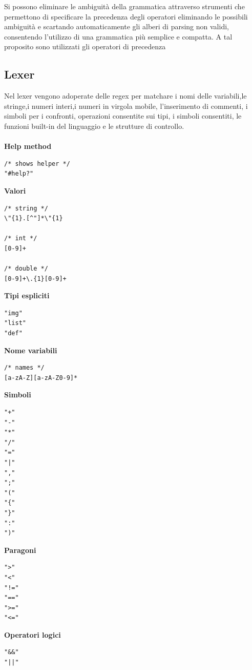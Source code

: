 \documentclass[10pt]{article}
\begin{document}
Si possono eliminare le ambiguità della grammatica attraverso strumenti che permettono di specificare la precedenza degli operatori eliminando le possibili ambiguità e scartando automaticamente gli alberi di parsing non validi, consentendo l'utilizzo di una grammatica più semplice e compatta. A tal proposito sono utilizzati gli operatori di precedenza %
\clearpage
\subsection{Lexer}
Nel lexer vengono adoperate delle regex per matchare i nomi delle variabili,le stringe,i numeri interi,i numeri in virgola mobile, l'inserimento di commenti, i simboli per i confronti, operazioni consentite sui tipi, i simboli consentiti, le funzioni built-in del linguaggio e le strutture di controllo. \\\\

\textbf{Help method}
\begin{lstlisting}[breaklines=true, postbreak=\mbox{{$\hookrightarrow$}\space}]
/* shows helper */
"#help?"             
\end{lstlisting}

\textbf{Valori}
\begin{lstlisting}[breaklines=true, postbreak=\mbox{{$\hookrightarrow$}\space}]
/* string */
\"{1}.[^"]*\"{1}      

/* int */
[0-9]+                

/* double */
[0-9]+\.{1}[0-9]+    
\end{lstlisting}

\textbf{Tipi espliciti}
\begin{lstlisting}[breaklines=true, postbreak=\mbox{{$\hookrightarrow$}\space}]
"img"   
"list" 
"def"   
\end{lstlisting}

\textbf{Nome variabili}
\begin{lstlisting}[breaklines=true, postbreak=\mbox{{$\hookrightarrow$}\space}]
/* names */
[a-zA-Z][a-zA-Z0-9]*  
\end{lstlisting}

\textbf{Simboli}
\begin{lstlisting}[breaklines=true, postbreak=\mbox{{$\hookrightarrow$}\space}]
"+" 
"-" 
"*" 
"/" 
"=" 
"|" 
"," 
";" 
"(" 
"{" 
"}" 
":" 
")"     
\end{lstlisting}

\textbf{Paragoni}
\begin{lstlisting}[breaklines=true, postbreak=\mbox{{$\hookrightarrow$}\space}]
">"     
"<"    
"!="    
"=="   
">="    
"<="    
\end{lstlisting}
\clearpage
\textbf{Operatori logici}
\begin{lstlisting}[breaklines=true, postbreak=\mbox{{$\hookrightarrow$}\space}] 
"&&"    
"||"   
\end{lstlisting}
\end{document}

